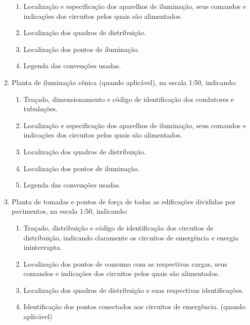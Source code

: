\begin{enumerate}
\begin{enumerate}
		\item Localização e especificação dos aparelhos de iluminação, seus comandos e indicações dos circuitos pelos quais são alimentados.
		
		\item Localização dos quadros de distribuição.
		
		\item Localização dos pontos de iluminação.
		
		\item Legenda das convenções usadas.
	\end{enumerate}
	
	\item Planta de iluminação cênica (quando aplicável), na escala 1:50, indicando:
	\begin{enumerate}
		\item Traçado, dimensionamento e código de identificação dos condutores e tubulações.
		
		\item Localização e especificação dos aparelhos de iluminação, seus comandos e indicações dos circuitos pelos quais são alimentados.
		
		\item Localização dos quadros de distribuição.
		
		\item Localização dos pontos de iluminação.
		
		\item Legenda das convenções usadas.
	\end{enumerate}
	
	\item Planta de tomadas e pontos de força de todas as edificações divididas por pavimentos, na escala 1:50, indicando:
	\begin{enumerate}
		
		\item Traçado, distribuição e código de identificação dos circuitos de distribuição, indicando claramente os circuitos de emergência e energia ininterrupta.
		
		\item Localização dos pontos de consumo com as respectivas cargas, seus comandos e indicações dos circuitos pelos quais são alimentados.
		
		\item Localização dos quadros de distribuição e suas respectivas identificações.
		
		\item Identificação dos pontos conectados aos circuitos de emergência. (quando aplicável)
		

\end{enumerate}
\end{enumerate}

